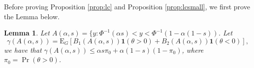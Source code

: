\documentclass[11pt]{article}
\newtheorem{lemma}[theorem]{Lemma}
\begin{document}






Before proving Proposition \ref{prop:lc} and Proposition \ref{prop:lcsmall}, we first prove the Lemma below.
\begin{lemma}
	Let $A(\alpha,s) = \{y: \Phi^{-1}(\alpha s) < y < \Phi^{-1}(1-\alpha (1-s))$. Let 
	\begin{equation*}
		\gamma(A(\alpha,s)) = \text{E}_G[B_1(A(\alpha,s))\textbf{1}(\theta > 0)+B_2(A(\alpha,s))\textbf{1}(\theta < 0)], 
	\end{equation*}
	we have that $\gamma(A(\alpha,s)) \leq \alpha s \pi_0 +\alpha (1-s) (1-\pi_0)$,
	where $\pi_0 = \Pr(\theta > 0)$.
	\label{lemma:lc}
\end{lemma}
\end{document}
